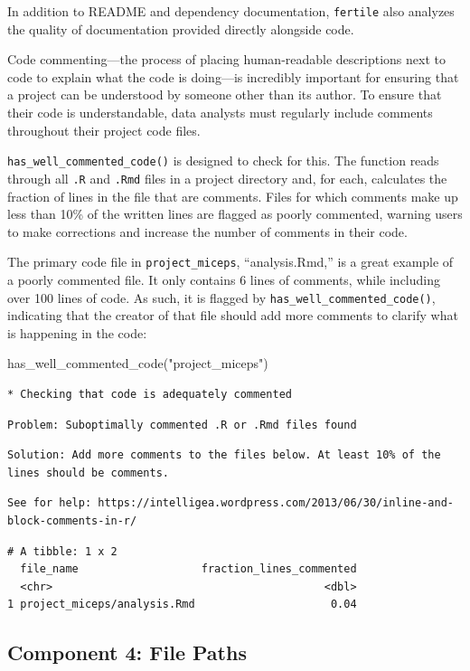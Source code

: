 \documentclass[12pt,twoside]{reedthesis}
\newenvironment{Shaded}{\begin{snugshade}}{\end{snugshade}}
\newcommand{\FunctionTok}[1]{\textcolor[rgb]{0.00,0.00,0.00}{#1}}
\newcommand{\NormalTok}[1]{#1}
\newcommand{\StringTok}[1]{\textcolor[rgb]{0.31,0.60,0.02}{#1}}
\begin{document}
In addition to README and dependency documentation, \texttt{fertile} also analyzes the quality of documentation provided directly alongside code.

Code commenting---the process of placing human-readable descriptions next to code to explain what the code is doing---is incredibly important for ensuring that a project can be understood by someone other than its author. To ensure that their code is understandable, data analysts must regularly include comments throughout their project code files.

\texttt{has\_well\_commented\_code()} is designed to check for this. The function reads through all \texttt{.R} and \texttt{.Rmd} files in a project directory and, for each, calculates the fraction of lines in the file that are comments. Files for which comments make up less than 10\% of the written lines are flagged as poorly commented, warning users to make corrections and increase the number of comments in their code.

The primary code file in \texttt{project\_miceps}, ``analysis.Rmd,'' is a great example of a poorly commented file. It only contains 6 lines of comments, while including over 100 lines of code. As such, it is flagged by \texttt{has\_well\_commented\_code()}, indicating that the creator of that file should add more comments to clarify what is happening in the code:
\begin{Shaded}
\begin{Highlighting}[]
\FunctionTok{has\_well\_commented\_code}\NormalTok{(}\StringTok{"project\_miceps"}\NormalTok{)}
\end{Highlighting}
\end{Shaded}
\begin{verbatim}
* Checking that code is adequately commented 
\end{verbatim}
\begin{verbatim}
Problem: Suboptimally commented .R or .Rmd files found 
\end{verbatim}
\begin{verbatim}
Solution: Add more comments to the files below. At least 10% of the
lines should be comments. 
\end{verbatim}
\begin{verbatim}
See for help: https://intelligea.wordpress.com/2013/06/30/inline-and-
block-comments-in-r/
\end{verbatim}
\begin{verbatim}
# A tibble: 1 x 2
  file_name                   fraction_lines_commented
  <chr>                                          <dbl>
1 project_miceps/analysis.Rmd                     0.04
\end{verbatim}
\hypertarget{component-4-file-paths}{%
\subsection{Component 4: File Paths}\label{component-4-file-paths}}
\end{document}
